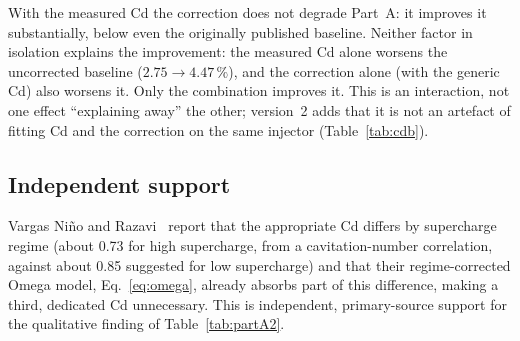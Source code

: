 \documentclass[11pt,a4paper]{article}
\begin{document}
With the measured Cd the correction does not degrade Part~A: it improves it substantially, below even the originally published baseline. Neither factor in isolation explains the improvement: the measured Cd alone worsens the uncorrected baseline ($2.75\to4.47\,\%$), and the correction alone (with the generic Cd) also worsens it. Only the combination improves it. This is an interaction, not one effect ``explaining away'' the other; version~2 adds that it is not an artefact of fitting Cd and the correction on the same injector (Table~\ref{tab:cdb}).

\subsection{Independent support}
Vargas Ni\~no and Razavi~\cite{nino2019} report that the appropriate Cd differs by supercharge regime (about 0.73 for high supercharge, from a cavitation-number correlation, against about 0.85 suggested for low supercharge) and that their regime-corrected Omega model, Eq.~\eqref{eq:omega}, already absorbs part of this difference, making a third, dedicated Cd unnecessary. This is independent, primary-source support for the qualitative finding of Table~\ref{tab:partA2}.

\end{document}

